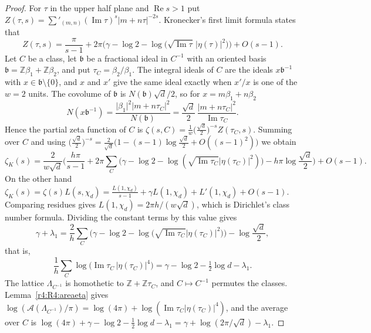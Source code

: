 \begin{proof}
For $\tau$ in the upper half plane and $\operatorname{Re}s>1$ put $Z(\tau,s)=\sum'_{(m,n)}(\operatorname{Im}\tau)^s\lvert m+n\tau\rvert^{-2s}$. Kronecker's first limit formula states that
\begin{equation}\label{r4:R4:KLF}
Z(\tau,s)=\frac\pi{s-1}+2\pi\Big(\gamma-\log2-\log\big(\sqrt{\operatorname{Im}\tau}\,\lvert\eta(\tau)\rvert^2\big)\Big)+O(s-1).
\end{equation}
Let $C$ be a class, let $\mathfrak b$ be a fractional ideal in $C^{-1}$ with an oriented basis $\mathfrak b=\mathbb Z\beta_1+\mathbb Z\beta_2$, and put $\tau_C=\beta_2/\beta_1$. The integral ideals of $C$ are the ideals $x\mathfrak b^{-1}$ with $x\in\mathfrak b\setminus\{0\}$, and $x$ and $x'$ give the same ideal exactly when $x'/x$ is one of the $w=2$ units. The covolume of $\mathfrak b$ is $N(\mathfrak b)\sqrt d/2$, so for $x=m\beta_1+n\beta_2$
\[
N(x\mathfrak b^{-1})=\frac{\lvert\beta_1\rvert^2\lvert m+n\tau_C\rvert^2}{N(\mathfrak b)}=\frac{\sqrt d}{2}\,\frac{\lvert m+n\tau_C\rvert^2}{\operatorname{Im}\tau_C}.
\]
Hence the partial zeta function of $C$ is $\zeta(s,C)=\frac1w\big(\frac{\sqrt d}2\big)^{-s}Z(\tau_C,s)$. Summing over $C$ and using $\big(\frac{\sqrt d}2\big)^{-s}=\frac2{\sqrt d}\big(1-(s-1)\log\frac{\sqrt d}2+O((s-1)^2)\big)$ we obtain
\[
\zeta_K(s)=\frac2{w\sqrt d}\Big(\frac{h\pi}{s-1}+2\pi\sum_C\big(\gamma-\log2-\log(\sqrt{\operatorname{Im}\tau_C}\lvert\eta(\tau_C)\rvert^2)\big)-h\pi\log\frac{\sqrt d}2\Big)+O(s-1).
\]
On the other hand $\zeta_K(s)=\zeta(s)L(s,\chi_d)=\frac{L(1,\chi_d)}{s-1}+\gamma L(1,\chi_d)+L'(1,\chi_d)+O(s-1)$. Comparing residues gives $L(1,\chi_d)=2\pi h/(w\sqrt d)$, which is Dirichlet's class number formula. Dividing the constant terms by this value gives
\[
\gamma+\lambda_1=\frac2h\sum_C\Big(\gamma-\log2-\log\big(\sqrt{\operatorname{Im}\tau_C}\lvert\eta(\tau_C)\rvert^2\big)\Big)-\log\frac{\sqrt d}2,
\]
that is,
\[
\frac1h\sum_C\log\big(\operatorname{Im}\tau_C\,\lvert\eta(\tau_C)\rvert^4\big)=\gamma-\log2-\tfrac12\log d-\lambda_1 .
\]
The lattice $\Lambda_{C^{-1}}$ is homothetic to $\mathbb Z+\mathbb Z\tau_C$, and $C\mapsto C^{-1}$ permutes the classes. Lemma~\ref{r4:R4:areaeta} gives $\log(\mathcal A(\Lambda_{C^{-1}})/\pi)=\log(4\pi)+\log(\operatorname{Im}\tau_C\lvert\eta(\tau_C)\rvert^4)$, and the average over $C$ is $\log(4\pi)+\gamma-\log2-\frac12\log d-\lambda_1=\gamma+\log(2\pi/\sqrt d)-\lambda_1$.
\end{proof}

